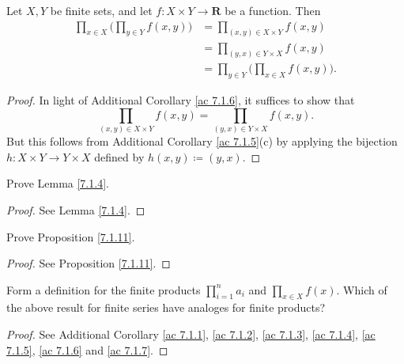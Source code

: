 \begin{additional corollary}\label{ac 7.1.7}
Let \(X, Y\) be finite sets, and let \(f : X \times Y \to \mathbf{R}\) be a function.
Then
\begin{align*}
\prod_{x \in X} \bigg(\prod_{y \in Y} f(x, y)\bigg) &= \prod_{(x, y) \in X \times Y} f(x, y) \\
&= \prod_{(y, x) \in Y \times X} f(x, y) \\
&= \prod_{y \in Y} \bigg(\prod_{x \in X} f(x, y)\bigg).
\end{align*}
\end{additional corollary}

\begin{proof}
In light of Additional Corollary \ref{ac 7.1.6}, it suffices to show that
\[
    \prod_{(x, y) \in X \times Y} f(x, y) = \prod_{(y, x) \in Y \times X} f(x, y).
\]
But this follows from Additional Corollary \ref{ac 7.1.5}(c) by applying the bijection \(h : X \times Y \to Y \times X\) defined by \(h(x, y) \coloneqq (y, x)\).
\end{proof}

\exercisesection

\begin{exercise}\label{ex 7.1.1}
Prove Lemma \ref{7.1.4}.
\end{exercise}

\begin{proof}
See Lemma \ref{7.1.4}.
\end{proof}

\begin{exercise}\label{ex 7.1.2}
Prove Proposition \ref{7.1.11}.
\end{exercise}

\begin{proof}
See Proposition \ref{7.1.11}.
\end{proof}

\begin{exercise}\label{ex 7.1.3}
Form a definition for the finite products \(\prod_{i = 1}^n a_i\) and \(\prod_{x \in X} f(x)\).
Which of the above result for finite series have analoges for finite products?
\end{exercise}

\begin{proof}
See Additional Corollary \ref{ac 7.1.1}, \ref{ac 7.1.2}, \ref{ac 7.1.3}, \ref{ac 7.1.4}, \ref{ac 7.1.5}, \ref{ac 7.1.6} and \ref{ac 7.1.7}.
\end{proof}